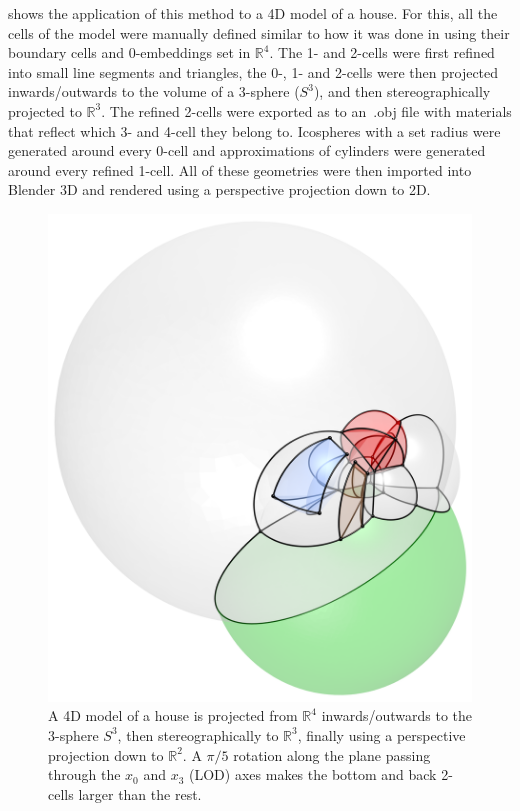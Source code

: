  shows the application of this method to a 4D model of a house.
For this, all the cells of the model were manually defined similar to how it was done in  using their boundary cells and 0-embeddings set in $\mathbb{R}^4$.
The 1- and 2-cells were first refined into small line segments and triangles, the 0-, 1- and 2-cells were then projected inwards/outwards to the volume of a 3-sphere ($S^3$), and then stereographically projected to $\mathbb{R}^3$.
The refined 2-cells were exported as to an\ {}.obj file with materials that reflect which 3- and 4-cell they belong to.
Icospheres with a set radius were generated around every 0-cell and approximations of cylinders were generated around every refined 1-cell.
All of these geometries were then imported into Blender 3D and rendered using a perspective projection down to 2D.

\begin{figure}[tb]
\centering
\includegraphics[width=\linewidth]{figs/4dhouse}
\caption[4D to 2D projection of a 4D house]{A 4D model of a house is projected from $\mathbb{R}^4$ inwards/outwards to the 3-sphere $S^3$, then stereographically to $\mathbb{R}^3$, finally using a perspective projection down to $\mathbb{R}^2$.
A $\pi / 5$ rotation along the plane passing through the $x_0$ and $x_3$ (LOD) axes makes the bottom and back 2-cells larger than the rest.}
\label{fig:4dhouse}
\end{figure}

